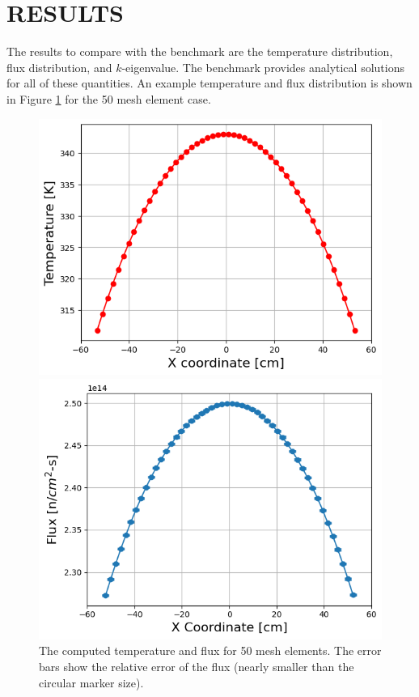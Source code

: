 \documentclass[letterpaper]{mc2023}
\begin{document}
\section{RESULTS}\label{sec:results}
The results to compare with the benchmark are the temperature distribution, flux distribution, and $k$-eigenvalue. The benchmark provides
analytical solutions for all of these quantities. An example temperature and flux distribution is shown in Figure \ref{fig:temp_flux_50}
for the 50 mesh element case.
\begin{figure}[H]
    \centering
    \begin{minipage}[b]{0.495\linewidth}
        \includegraphics[width=\linewidth]{figures/temp_50.png}
    \end{minipage}
    \begin{minipage}[b]{0.495\linewidth}
        \includegraphics[width=\linewidth]{figures/flux_50.png}
    \end{minipage}
    \caption{The computed temperature and flux for 50 mesh elements. The error bars show the relative error of the flux
    (nearly smaller than the circular marker size).}\label{fig:temp_flux_50}
\end{figure}
\end{document}
